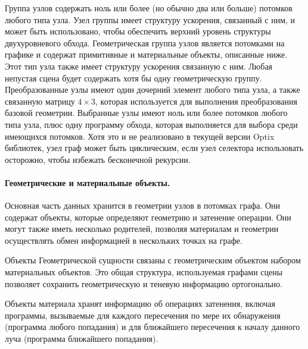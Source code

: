 Группа узлов содержать ноль или более (но обычно два или больше) потомков любого типа узла.
Узел группы имеет структуру ускорения, связанный с ним, и может быть использовано, чтобы обеспечить верхний уровень структуры двухуровневого обхода.
Геометрическая группа узлов является потомками на графике и содержат примитивные и материальные объекты, описанные ниже.
Этот тип узла также имеет структуру ускорения связанную с ним.
Любая непустая сцена будет содержать хотя бы одну геометрическую группу.
Преобразованные узлы имеют один дочерний элемент любого типа узла, а также связанную матрицу $4 \times 3$, которая используется для выполнения преобразования базовой геометрии.
Выбранные узлы имеют ноль или более потомков любого типа узла, плюс одну программу обхода, которая выполняется для выбора среди имеющихся потомков.
Хотя это и не реализовано в текущей версии Optix библиотек, узел граф может быть циклическим, если узел селектора использовать осторожно, чтобы избежать бесконечной рекурсии.

\paragraph{ Геометрические и материальные объекты.}

Основная часть данных хранится в геометрии узлов в потомках графа.
Они содержат объекты, которые определяют геометрию и затенение операции.
Они могут также иметь несколько родителей, позволяя материалам и геометрии осуществлять обмен информацией в нескольких точках на графе.

Объекты Геометрической сущности связаны с геометрическим объектом набором материальных объектов.
Это общая структура, используемая графами сцены позволяет сохранить геометрическую и теневую информацию ортогонально.

Объекты материала хранят информацию об операциях затенения, включая программы, вызываемые для каждого пересечения по мере их обнаружения (программа любого попадания) и для ближайшего пересечения к началу данного луча (программа ближайшего попадания).

